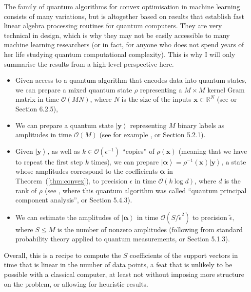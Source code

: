 \documentclass[aps, reprint, onecolumn, nofootinbib, longbibliography]{revtex4-2}
\newcommand{\ket}[1]{\ensuremath{\left| #1 \right \rangle}}
\begin{document}
The family of quantum algorithms for convex optimisation in machine learning consists of many variations, but is altogether based on results that establish fast linear algebra processing routines for quantum computers. They are very technical in design, which is why they may not be easily accessible to many machine learning researchers (or in fact, for anyone who does not spend years of her life studying quantum computational complexity). This is why I will only summarise the results from a high-level perspective here. 

\begin{itemize}
    \item Given access to a quantum algorithm that encodes data into quantum states, we can prepare a mixed quantum state $\rho$ representing a $M \times M$ kernel Gram matrix in time $\mathcal{O}(MN)$, where $N$ is the size of the inputs $\mathbf{x} \in \mathbb{R}^N$ (see \cite{rebentrost2014quantum} or \cite{schuld2018supervised} Section 6.2.5),
    \item We can prepare a quantum state $\ket{\mathbf{y}}$ representing $M$ binary labels as amplitudes in time $\mathcal{O}(M)$ (see for example \cite{iten2016quantum}, or \cite{schuld2018supervised} Section 5.2.1).
    \item Given $\ket{\mathbf{y}}$, as well as $k \in \mathcal{O}(\epsilon^{-1})$ ``copies'' of $\rho(\mathbf{x})$ (meaning that we have to repeat the first step $k$ times), we can prepare $\ket{\boldsymbol\alpha} = \rho^{-1}(\mathbf{x}) \ket{\mathbf{y}}$, a state whose amplitudes correspond to the coefficients $\boldsymbol{\alpha}$ in Theorem~(\ref{thm:convex}), to precision $\epsilon$ in time $\mathcal{O}(k \log d)$, where $d$ is the rank of $\rho$ (see \cite{lloyd2014quantum}, where this quantum algorithm was called ``quantum principal component analysis'', or \cite{schuld2018supervised} Section 5.4.3).
    \item We can estimate the amplitudes of $\ket{\boldsymbol\alpha}$ in time $\mathcal{O}(S/\tilde{\epsilon}^2)$ to precision $\tilde{\epsilon}$, where $S \leq M$ is the number of nonzero amplitudes (following from standard probability theory applied to quantum measurements, or \cite{schuld2018supervised} Section 5.1.3).
\end{itemize}
Overall, this is a recipe to compute the $S$ coefficients of the support vectors in time that is linear in the number of data points, a feat that is unlikely to be possible with a classical computer, at least not without imposing more structure on the problem, or allowing for heuristic results.
\end{document}
